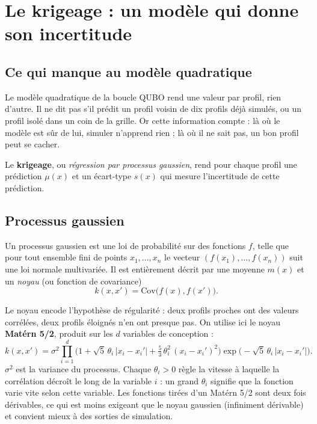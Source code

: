 \chapter{Le krigeage : un modèle qui donne son incertitude}\label{ch:krigeage}

\section{Ce qui manque au modèle quadratique}
Le modèle quadratique de la boucle QUBO rend une valeur par profil, rien d'autre. Il ne dit pas s'il prédit un profil voisin de dix profils déjà simulés, ou un profil isolé dans un coin de la grille. Or cette information compte : là où le modèle est sûr de lui, simuler n'apprend rien ; là où il ne sait pas, un bon profil peut se cacher.

Le \textbf{krigeage}, ou \emph{régression par processus gaussien}, rend pour chaque profil une prédiction $\mu(x)$ et un écart-type $s(x)$ qui mesure l'incertitude de cette prédiction.

\section{Processus gaussien}
\begin{definition}
Un processus gaussien est une loi de probabilité sur des fonctions $f$, telle que pour tout ensemble fini de points $x_1,\dots,x_n$ le vecteur $(f(x_1),\dots,f(x_n))$ suit une loi normale multivariée. Il est entièrement décrit par une moyenne $m(x)$ et un \emph{noyau} (ou fonction de covariance)
\[
k(x,x')=\mathrm{Cov}\big(f(x),f(x')\big).
\]
\end{definition}

Le noyau encode l'hypothèse de régularité : deux profils proches ont des valeurs corrélées, deux profils éloignés n'en ont presque pas. On utilise ici le noyau \textbf{Matérn 5/2}, produit sur les $d$ variables de conception :
\[
k(x,x')=\sigma^2\prod_{i=1}^{d}\Big(1+\sqrt5\,\theta_i\,|x_i-x_i'|+\tfrac53\,\theta_i^2\,(x_i-x_i')^2\Big)\exp\!\big(-\sqrt5\,\theta_i\,|x_i-x_i'|\big).
\]
$\sigma^2$ est la variance du processus. Chaque $\theta_i>0$ règle la vitesse à laquelle la corrélation décroît le long de la variable $i$ : un grand $\theta_i$ signifie que la fonction varie vite selon cette variable. Les fonctions tirées d'un Matérn 5/2 sont deux fois dérivables, ce qui est moins exigeant que le noyau gaussien (infiniment dérivable) et convient mieux à des sorties de simulation.


